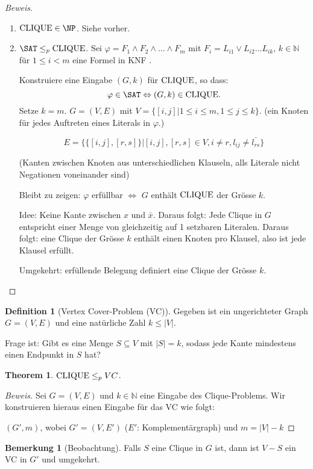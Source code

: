 \documentclass[11pt]{article} %
\theoremstyle{definition}
\newtheorem{definition}{Definition}
\newtheorem*{bemerkung}{Bemerkung}
\newtheorem{theorem}{Theorem}
\begin{document}
\begin{proof}[Beweis]
\begin{enumerate}
\item $\CLIQUE \in \NP$. Siehe vorher.
\item $\SAT \le_p \CLIQUE$. Sei $\varphi = F_1 \land F_2 \land \dots \land F_m$ mit $F_i = L_{i1} \lor L_{i2} \dots L_{ik}$, $k \in \mathbb{N}$ für $1 \le i < m$ eine Formel in KNF .

Konstruiere eine Eingabe $(G, k)$ für $\mathrm{CLIQUE}$, so dass:
\[
\varphi \in \SAT \Leftrightarrow (G, k) \in \CLIQUE.
\]
Setze $k = m$. $G = (V,E)$ mit $V = \{ [i,j] | 1 \le i \le m, 1 \le j \le k \}.$ (ein Knoten für jedes Auftreten eines Literals in $\varphi$.)

\[
E = \{ \{ [ i,j ], [r,s] \} | [i,j], [r,s] \in V, i \ne r, l_{ij} \ne \bar{l_{rs}} \}
\]

(Kanten zwischen Knoten aus unterschiedlichen Klauseln, alls Literale nicht Negationen voneinander sind)


Bleibt zu zeigen: $\varphi$ erfüllbar $\Leftrightarrow$ $G$ enthält $\mathrm{CLIQUE}$ der Grösse $k$.

Idee: Keine Kante zwischen $x$ und $\bar{x}$. Daraus folgt: Jede Clique in $G$ entspricht einer Menge von gleichzeitig auf 1 setzbaren Literalen. Daraus folgt: eine Clique der Grösse $k$ enthält einen Knoten pro Klausel, also ist jede Klausel erfüllt.

Umgekehrt: erfüllende Belegung definiert eine Clique der Grösse $k$.

\end{enumerate}
\end{proof}

\begin{definition}[Vertex Cover-Problem (VC)]

Gegeben ist ein ungerichteter Graph $G = (V, E)$ und eine natürliche Zahl $k \le |V|$.

Frage ist: Gibt es eine Menge $S \subseteq V$ mit $|S| = k$, sodass jede Kante mindestens einen Endpunkt in $S$ hat?

\end{definition}

\begin{theorem}
$\mathrm{CLIQUE} \le_p VC$.
\end{theorem}

\begin{proof}[Beweis]
Sei $G = (V,E)$ und $k \in\mathbb{N}$ eine Eingabe des Clique-Problems. Wir konstruieren hieraus einen Eingabe für das VC wie folgt:

$(G', m)$, wobei $G' = (V, E')$ ($E'$: Komplementärgraph) und $m = |V| - k$
\end{proof}

\begin{bemerkung}[Beobachtung]
Falls $S$ eine Clique in $G$ ist, dann ist $V-S$ ein VC in $G'$ und umgekehrt.
\end{bemerkung}
\end{document}

